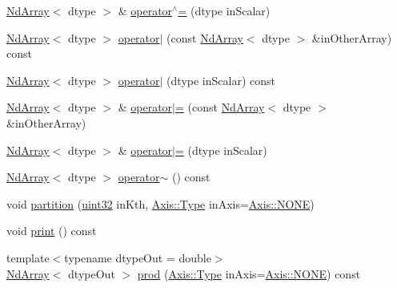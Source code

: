 \begin{DoxyCompactItemize}
\item 
\mbox{\hyperlink{class_num_c_1_1_nd_array}{Nd\+Array}}$<$ dtype $>$ \& \mbox{\hyperlink{class_num_c_1_1_nd_array_ae3000c505b1b440b8d155bbb7c328b40}{operator$^\wedge$=}} (dtype in\+Scalar)
\item 
\mbox{\hyperlink{class_num_c_1_1_nd_array}{Nd\+Array}}$<$ dtype $>$ \mbox{\hyperlink{class_num_c_1_1_nd_array_a9245e3c47205fbdcd4f8e616d6930e38}{operator$\vert$}} (const \mbox{\hyperlink{class_num_c_1_1_nd_array}{Nd\+Array}}$<$ dtype $>$ \&in\+Other\+Array) const
\item 
\mbox{\hyperlink{class_num_c_1_1_nd_array}{Nd\+Array}}$<$ dtype $>$ \mbox{\hyperlink{class_num_c_1_1_nd_array_a09200210c896b5547fe64f135c7e8f7b}{operator$\vert$}} (dtype in\+Scalar) const
\item 
\mbox{\hyperlink{class_num_c_1_1_nd_array}{Nd\+Array}}$<$ dtype $>$ \& \mbox{\hyperlink{class_num_c_1_1_nd_array_a406a8df3406d584a30433405785bdd1f}{operator$\vert$=}} (const \mbox{\hyperlink{class_num_c_1_1_nd_array}{Nd\+Array}}$<$ dtype $>$ \&in\+Other\+Array)
\item 
\mbox{\hyperlink{class_num_c_1_1_nd_array}{Nd\+Array}}$<$ dtype $>$ \& \mbox{\hyperlink{class_num_c_1_1_nd_array_a8b5adc0e2a4dc3b86a31103bc74810df}{operator$\vert$=}} (dtype in\+Scalar)
\item 
\mbox{\hyperlink{class_num_c_1_1_nd_array}{Nd\+Array}}$<$ dtype $>$ \mbox{\hyperlink{class_num_c_1_1_nd_array_a9d84b394bbbe64d9e05f6e2246f83bee}{operator$\sim$}} () const
\item 
void \mbox{\hyperlink{class_num_c_1_1_nd_array_aff67329d4dc3c27b160649ead4e1f30e}{partition}} (\mbox{\hyperlink{namespace_num_c_ae685802ca6d3035f2b400b081e3953fa}{uint32}} in\+Kth, \mbox{\hyperlink{struct_num_c_1_1_axis_a8e689044ef1941a03482e730c5e7ebb3}{Axis\+::\+Type}} in\+Axis=\mbox{\hyperlink{struct_num_c_1_1_axis_a8e689044ef1941a03482e730c5e7ebb3a0ae033c4226f7184bf0050b101e7ed94}{Axis\+::\+N\+O\+NE}})
\item 
void \mbox{\hyperlink{class_num_c_1_1_nd_array_a4326a363b8f016fc72ba4ec22485f9de}{print}} () const
\item 
{\footnotesize template$<$typename dtype\+Out  = double$>$ }\\\mbox{\hyperlink{class_num_c_1_1_nd_array}{Nd\+Array}}$<$ dtype\+Out $>$ \mbox{\hyperlink{class_num_c_1_1_nd_array_ab8ed6e901ba5ef37797047b4bbf67b73}{prod}} (\mbox{\hyperlink{struct_num_c_1_1_axis_a8e689044ef1941a03482e730c5e7ebb3}{Axis\+::\+Type}} in\+Axis=\mbox{\hyperlink{struct_num_c_1_1_axis_a8e689044ef1941a03482e730c5e7ebb3a0ae033c4226f7184bf0050b101e7ed94}{Axis\+::\+N\+O\+NE}}) const

\end{DoxyCompactItemize}
